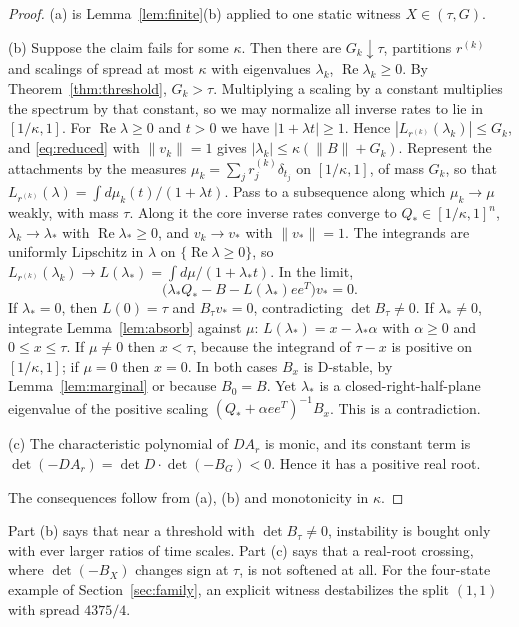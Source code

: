 \documentclass[11pt,a4paper]{article}
\theoremstyle{plain}
\theoremstyle{definition}
\theoremstyle{remark}
\newcommand{\Real}{\operatorname{Re}}
\begin{document}
\begin{proof}
(a) is Lemma~\ref{lem:finite}(b) applied to one static witness $X\in(\tau,G)$.

(b) Suppose the claim fails for some $\kappa$. Then there are
$G_k\downarrow\tau$, partitions $r^{(k)}$ and scalings of spread at most
$\kappa$ with eigenvalues $\lambda_k$, $\Real\lambda_k\ge0$. By
Theorem~\ref{thm:threshold}, $G_k>\tau$. Multiplying a scaling by a
constant multiplies the spectrum by that constant, so we may normalize all
inverse rates to lie in $[1/\kappa,1]$. For $\Real\lambda\ge0$ and $t>0$ we
have $|1+\lambda t|\ge1$. Hence $|L_{r^{(k)}}(\lambda_k)|\le G_k$, and
\eqref{eq:reduced} with $\|v_k\|=1$ gives
$|\lambda_k|\le\kappa(\|B\|+G_k)$. Represent the attachments by the measures
$\mu_k=\sum_jr^{(k)}_j\delta_{t_j}$ on $[1/\kappa,1]$, of mass $G_k$, so that
$L_{r^{(k)}}(\lambda)=\int d\mu_k(t)/(1+\lambda t)$. Pass to a subsequence
along which $\mu_k\to\mu$ weakly, with mass $\tau$. Along it the core inverse
rates converge to $Q_*\in[1/\kappa,1]^n$, $\lambda_k\to\lambda_*$ with
$\Real\lambda_*\ge0$, and $v_k\to v_*$ with $\|v_*\|=1$. The integrands are
uniformly Lipschitz in $\lambda$ on $\{\Real\lambda\ge0\}$, so
$L_{r^{(k)}}(\lambda_k)\to L(\lambda_*)=\int d\mu/(1+\lambda_*t)$. In the limit,
\[
 \bigl(\lambda_*Q_*-B-L(\lambda_*)ee^{T}\bigr)v_*=0 .
\]
If $\lambda_*=0$, then $L(0)=\tau$ and $B_\tau v_*=0$, contradicting
$\det B_\tau\ne0$. If $\lambda_*\ne0$, integrate Lemma~\ref{lem:absorb}
against $\mu$: $L(\lambda_*)=x-\lambda_*\alpha$ with $\alpha\ge0$ and
$0\le x\le\tau$. If $\mu\ne0$ then $x<\tau$, because the integrand of $\tau-x$ is
positive on $[1/\kappa,1]$; if $\mu=0$ then $x=0$. In both cases $B_x$ is
D-stable, by Lemma~\ref{lem:marginal} or because $B_0=B$. Yet $\lambda_*$ is a
closed-right-half-plane eigenvalue of the positive scaling
$(Q_*+\alpha ee^{T})^{-1}B_x$. This is a contradiction.

(c) The characteristic polynomial of $DA_r$ is monic, and its constant term is
$\det(-DA_r)=\det D\cdot\det(-B_G)<0$. Hence it has a positive real root.

The consequences follow from (a), (b) and monotonicity in $\kappa$.
\end{proof}

Part (b) says that near a threshold with $\det B_\tau\ne0$, instability is
bought only with ever larger ratios of time scales. Part (c) says that a
real-root crossing, where $\det(-B_X)$ changes sign at $\tau$, is not softened
at all. For the four-state example of Section~\ref{sec:family}, an explicit
witness destabilizes the split $(1,1)$ with spread $4375/4$.
\end{document}
